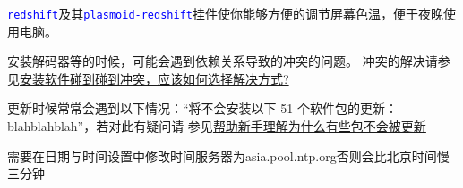\documentclass[11pt]{article}
\newcommand{\soft}[1]{\texttt{\textcolor{blue}{#1}}}
\begin{document}
\soft{redshift}及其\soft{plasmoid-redshift}挂件使你能够方便的调节屏幕色温，便于夜晚使用电脑。

安装解码器等的时候，可能会遇到依赖关系导致的冲突的问题。
冲突的解决请参见\href{https://forum.suse.org.cn/viewtopic.php?t=2867&p=22491#p22491}{安装软件碰到碰到冲突，应该如何选择解决方式?}

更新时候常常会遇到以下情况：“将不会安装以下 51 个软件包的更新：blahblahblah”，若对此有疑问请
参见\href{https://forum.suse.org.cn/viewtopic.php?t=2777&p=21896}{帮助新手理解为什么有些包不会被更新}

需要在日期与时间设置中修改时间服务器为asia.pool.ntp.org否则会比北京时间慢三分钟
\end{document}
